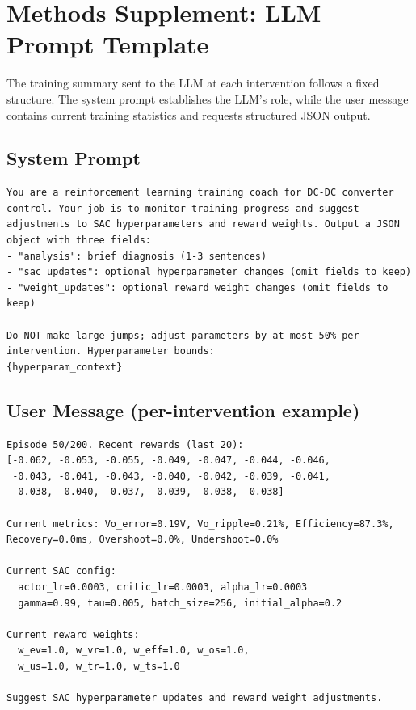 \documentclass[11pt,a4paper]{article}
\begin{document}
\section*{Methods Supplement: LLM Prompt Template}

The training summary sent to the LLM at each intervention follows a fixed
structure. The system prompt establishes the LLM's role, while the user
message contains current training statistics and requests structured JSON output.

\subsection*{System Prompt}

\begin{verbatim}
You are a reinforcement learning training coach for DC-DC converter
control. Your job is to monitor training progress and suggest
adjustments to SAC hyperparameters and reward weights. Output a JSON
object with three fields:
- "analysis": brief diagnosis (1-3 sentences)
- "sac_updates": optional hyperparameter changes (omit fields to keep)
- "weight_updates": optional reward weight changes (omit fields to keep)

Do NOT make large jumps; adjust parameters by at most 50% per
intervention. Hyperparameter bounds:
{hyperparam_context}
\end{verbatim}

\subsection*{User Message (per-intervention example)}

\begin{verbatim}
Episode 50/200. Recent rewards (last 20):
[-0.062, -0.053, -0.055, -0.049, -0.047, -0.044, -0.046,
 -0.043, -0.041, -0.043, -0.040, -0.042, -0.039, -0.041,
 -0.038, -0.040, -0.037, -0.039, -0.038, -0.038]

Current metrics: Vo_error=0.19V, Vo_ripple=0.21%, Efficiency=87.3%,
Recovery=0.0ms, Overshoot=0.0%, Undershoot=0.0%

Current SAC config:
  actor_lr=0.0003, critic_lr=0.0003, alpha_lr=0.0003
  gamma=0.99, tau=0.005, batch_size=256, initial_alpha=0.2

Current reward weights:
  w_ev=1.0, w_vr=1.0, w_eff=1.0, w_os=1.0,
  w_us=1.0, w_tr=1.0, w_ts=1.0

Suggest SAC hyperparameter updates and reward weight adjustments.
\end{verbatim}
\end{document}
